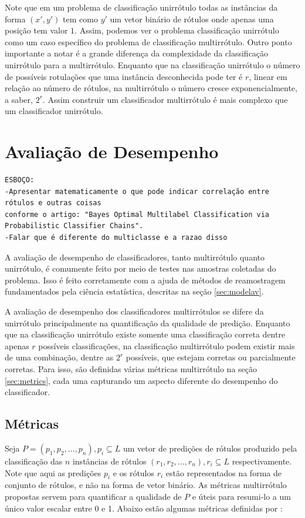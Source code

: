 Note que em um problema de classificação unirrótulo todas as instâncias da forma $(x',y')$ tem como $y'$
um vetor binário de rótulos onde apenas uma posição tem valor $1$. Assim, podemos ver o problema classificação
unirrótulo como um caso específico do problema de classificação multirrótulo.
Outro ponto importante a notar é a grande diferença da complexidade da classificação unirrótulo para a multirrótulo.
Enquanto que na classificação unirrótulo o número de possíveis rotulações que uma instância desconhecida pode ter é
$r$, linear em relação ao número de rótulos, na multirrótulo o número cresce exponencialmente, a saber, $2^r$.
Assim construir um classificador multirrótulo é mais complexo que um classificador unirrótulo.



\section{Avaliação de Desempenho}
\begin{verbatim}
ESBOÇO:
-Apresentar matematicamente o que pode indicar correlação entre rótulos e outras coisas
conforme o artigo: "Bayes Optimal Multilabel Classification via Probabilistic Classifier Chains".
-Falar que é diferente do multiclasse e a razao disso
\end{verbatim}

A avaliação de desempenho de classificadores, tanto multirrótulo quanto unirrótulo, é comumente feito
por meio de testes nas amostras coletadas do problema.
Isso é feito corretamente com a ajuda de métodos de reamostragem fundamentados pela ciência estatística,
descritas na seção \ref{sec:modelav}.

A avaliação de desempenho dos classificadores multirrótulos se difere da unirrótulo principalmente na
quantificação da qualidade de predição. Enquanto que na classificação unirrótulo existe somente uma classificação
correta dentre apenas $r$ possíveis classificações, na classificação multirrótulo podem existir mais de uma combinação, 
dentre as $2^r$ possíveis, que estejam corretas ou parcialmente corretas.
Para isso, são definidas várias métricas multirrótulo na seção \ref{sec:metrics},
cada uma capturando um aspecto diferente do desempenho do classificador. 



\subsection{Métricas}
Seja $P=(p_1,p_2,...,p_n), p_i \subseteq L$
um vetor de predições de rótulos produzido pela
classificação das $n$ instâncias de rótulos $(r_1,r_2,...,r_n), r_i \subseteq L$
respectivamente. Note que aqui as predições $p_i$ e os rótulos $r_i$ estão representados na forma de conjunto de rótulos,
e não na forma de vetor binário.
As métricas multirrótulo propostas servem para quantificar a qualidade de $P$
e úteis para resumi-lo a um único valor escalar entre 0 e 1.
Abaixo estão algumas métricas definidas por \cite{reviewml2013}:
\label{sec:metrics}
